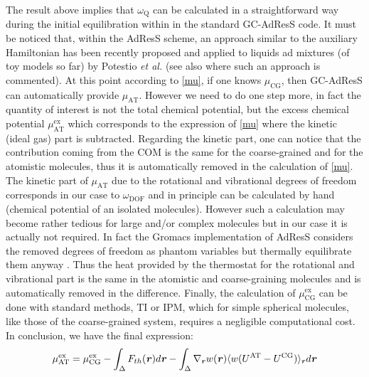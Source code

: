 \documentclass[a4paper,preprint,unsortedaddress]{revtex4-1}
\newcommand{\recheck}[1]{{\color{red} #1}}
\newcommand{\vect}[1]{\textbf{\textit{#1}}}
\newcommand{\dof}{{\textrm{DOF}}}
\newcommand{\AT}{{\textrm{{AT}}}}
\newcommand{\CG}{{\textrm{CG}}}
\newcommand{\exc}{{\textrm{ex}}}
\newcommand{\thermo}{{\textrm{Q}}}
\begin{document}
The result above implies that $\omega_{\thermo}$ can be calculated in a straightforward way during the initial equilibration within in the standard GC-AdResS code. 
\recheck{It must be noticed that, within the AdResS scheme, an approach similar to the auxiliary Hamiltonian  has been recently proposed and applied to liquids ad mixtures (of toy models so far) by Potestio {\it et al.} \cite{h-adress-0, h-adress} (see also \cite{luigientropy} where such an approach is commented)}. At this point according to \eqref{mu}, if one knows $\mu_{\CG}$, then  GC-AdResS can automatically provide $\mu_{\AT}$. However we need to do one step more, in fact the quantity of interest is not the total chemical potential, but the excess chemical potential $\mu^{\exc}_{\AT}$ which corresponds to the expression of \eqref{mu} where the kinetic (ideal gas) part is subtracted. Regarding the kinetic part, one can notice that the contribution coming from the COM is the same for the coarse-grained and for the atomistic molecules, thus it is automatically removed in the calculation of \eqref{mu}.
The kinetic part of $\mu_{\AT}$ due to the rotational and vibrational degrees of freedom corresponds in our case to $\omega_{\dof}$ and \recheck{in principle can be calculated by hand (chemical potential of an isolated molecules). However such a calculation may become rather tedious for large and/or complex molecules but in our case it is actually not required.} In fact the \recheck{Gromacs implementation of AdResS} considers the removed degrees of freedom as phantom variables but thermally equilibrate them anyway \cite{simon-ch}. Thus the heat provided by the thermostat for the rotational and vibrational part is the same in the atomistic and coarse-graining molecules and is automatically removed in the difference. Finally, the calculation of $\mu^{\exc}_{\CG}$ can be done with standard methods, TI or IPM, which for simple spherical molecules, like those of the coarse-grained system, requires a negligible computational cost.
In conclusion, we have the final expression:
\begin{equation}
  \mu^{\exc}_{\AT}=
  \mu^{\exc}_{\CG}-
  \int_{\Delta}{F}_{th}({\vect r})d{\vect r}-
  \int_{\Delta}\nabla_{\vect r} w(\vect r) \langle w(U^{\AT}-U^{\CG})\rangle_{\vect r} d{\vect r}
\label{finalmu}
\end{equation}
\end{document}
